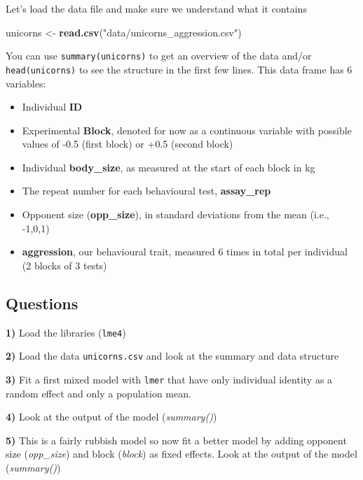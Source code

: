 \documentclass[
  12pt,
]{book}
\newenvironment{Shaded}{\begin{snugshade}}{\end{snugshade}}
\newcommand{\KeywordTok}[1]{\textcolor[rgb]{0.13,0.29,0.53}{\textbf{#1}}}
\newcommand{\NormalTok}[1]{#1}
\newcommand{\StringTok}[1]{\textcolor[rgb]{0.31,0.60,0.02}{#1}}
\providecommand{\tightlist}{%
  \setlength{\itemsep}{0pt}\setlength{\parskip}{0pt}}
\begin{document}
Let's load the data file and make sure we understand what it contains

\begin{Shaded}
\begin{Highlighting}[]
\NormalTok{unicorns <-}\StringTok{ }\KeywordTok{read.csv}\NormalTok{(}\StringTok{"data/unicorns_aggression.csv"}\NormalTok{)}
\end{Highlighting}
\end{Shaded}

You can use \texttt{summary(unicorns)} to get an overview of the data and/or \texttt{head(unicorns)} to see the structure in the first few lines. This data frame has 6 variables:

\begin{itemize}
\tightlist
\item
  Individual \textbf{ID}
\item
  Experimental \textbf{Block}, denoted for now as a continuous variable with possible values of -0.5 (first block) or +0.5 (second block)
\item
  Individual \textbf{body\_size}, as measured at the start of each block in kg
\item
  The repeat number for each behavioural test, \textbf{assay\_rep}
\item
  Opponent size (\textbf{opp\_size}), in standard deviations from the mean (i.e., -1,0,1)
\item
  \textbf{aggression}, our behavioural trait, measured 6 times in total per individual (2 blocks of 3 tests)
\end{itemize}

\hypertarget{questions-2}{%
\subsection{Questions}\label{questions-2}}

\textbf{1)} Load the libraries (\texttt{lme4})

\textbf{2)} Load the data \texttt{unicorns.csv} and look at the summary and data structure

\textbf{3)} Fit a first mixed model with \texttt{lmer} that have only individual identity as a random effect and only a population mean.

\textbf{4)} Look at the output of the model (\emph{summary()})

\textbf{5)} This is a fairly rubbish model so now fit a better model by adding opponent size (\emph{opp\_size}) and block (\emph{block}) as fixed effects. Look at the output of the model (\emph{summary()})
\end{document}

